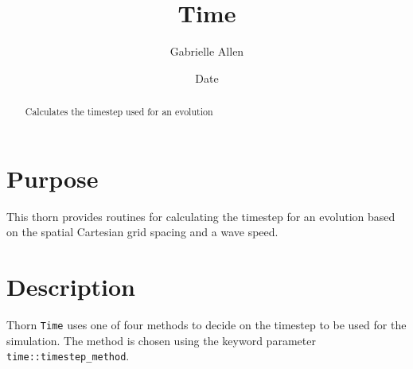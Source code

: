 \documentclass{article}
\begin{document}
\title{Time}
\author{Gabrielle Allen}
\date{$ $Date$ $}

\maketitle


\begin{abstract}
Calculates the timestep used for an evolution
\end{abstract}

\section{Purpose}

This thorn provides routines for calculating
the timestep for an evolution based on the spatial Cartesian grid spacing and
a wave speed. 

\section{Description}

Thorn {\tt Time} uses one of four methods to decide on the timestep
to be used for the simulation. The method is chosen using the
keyword parameter {\tt time::timestep\_method}. 
\end{document}
